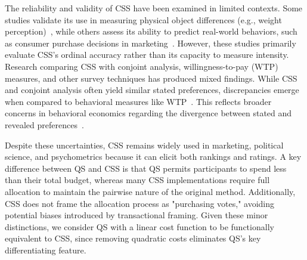 The reliability and validity of CSS have been examined in limited contexts. Some studies validate its use in measuring physical object differences (e.g., weight perception)~\cite{}, while others assess its ability to predict real-world behaviors, such as consumer purchase decisions in marketing~\cite{}. However, these studies primarily evaluate CSS’s ordinal accuracy rather than its capacity to measure intensity. Research comparing CSS with conjoint analysis, willingness-to-pay (WTP) measures, and other survey techniques has produced mixed findings. While CSS and conjoint analysis often yield similar stated preferences, discrepancies emerge when compared to behavioral measures like WTP~\cite{}. This reflects broader concerns in behavioral economics regarding the divergence between stated and revealed preferences~\cite{}.

Despite these uncertainties, CSS remains widely used in marketing, political science, and psychometrics because it can elicit both rankings and ratings. A key difference between QS and CSS is that QS permits participants to spend less than their total budget, whereas many CSS implementations require full allocation to maintain the pairwise nature of the original method. Additionally, CSS does not frame the allocation process as "purchasing votes," avoiding potential biases introduced by transactional framing. Given these minor distinctions, we consider QS with a linear cost function to be functionally equivalent to CSS, since removing quadratic costs eliminates QS’s key differentiating feature.
